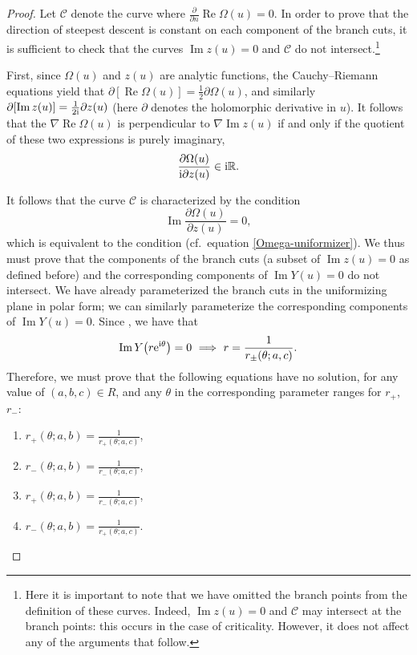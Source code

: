\documentclass[pdftex]{sigma}
\numberwithin{equation}{section}
\begin{document}
\begin{proof}
Let $\mathcal{C}$ denote the curve where $\frac{\partial}{\partial n} \operatorname{Re}\Omega(u) = 0$. In order to prove that the direction of steepest descent is constant on each component of the branch cuts, it is sufficient to check that the curves $\operatorname{Im} z(u) = 0$ and $\mathcal{C}$ do not intersect.\footnote{Here it is important to note that we have omitted the branch points from the definition of these curves. Indeed, $\operatorname{Im} z(u) = 0$ and $\mathcal{C}$ may intersect at the branch points: this occurs in the case of criticality. However, it does not affect any of the arguments that follow.}

First, since $\Omega(u)$ and $z(u)$ are analytic functions, the Cauchy--Riemann equations yield that $\partial[ \operatorname{Re}\Omega(u)] = \frac{1}{2}\partial \Omega(u)$,
and similarly $\partial [\operatorname{Im} z(u)] = \frac{1}{2{\rm i}}\partial z(u)$ (here $\partial$ denotes the holomorphic derivative in $u$). It follows that the $\nabla \operatorname{Re}\Omega(u)$ is perpendicular to $\nabla \operatorname{Im} z(u)$
if and only if the quotient of these two expressions is purely imaginary,
 \begin{equation*}
 \frac{\partial \Omega(u)}{{\rm i} \partial z(u)} \in {\rm i}\mathbb{R}.
 \end{equation*}

It follows that the curve $\mathcal{C}$ is characterized by the condition
 \begin{equation*}
 \operatorname{Im}\frac{\partial \Omega(u)}{\partial z(u)} = 0,
 \end{equation*}
which is equivalent to the condition  (cf.\ equation \eqref{Omega-uniformizer}).
We thus must prove that the components of the branch cuts (a subset of $\operatorname{Im} z(u) = 0$ as defined before) and the corresponding components of
$\operatorname{Im} Y(u) =0$ do not intersect.
We have already parameterized the branch cuts in the uniformizing plane in polar form; we can similarly parameterize the corresponding components of $\operatorname{Im}Y (u) = 0$. Since , we have that
 \begin{equation*}
 \operatorname{Im} Y\bigl(r{\rm e}^{{\rm i}\theta}\bigr) = 0 \ \Longrightarrow \ r = \frac{1}{r_{\pm}(\theta;a,c)}.
 \end{equation*}
Therefore, we must prove that the following equations have no solution, for any value of ${(a,b,c) \in R}$, and any $\theta$ in the corresponding parameter ranges
for $r_+$, $r_-$:
 \begin{enumerate}\itemsep=0pt
 \item[$(1)$] $r_{+}(\theta;a,b) = \frac{1}{r_{+}(\theta;a,c)}$,
 \item[$(2)$] $r_{-}(\theta;a,b) = \frac{1}{r_{-}(\theta;a,c)}$,
 \item[$(3)$] $r_{+}(\theta;a,b) = \frac{1}{r_{-}(\theta;a,c)}$,
 \item[$(4)$] $r_{-}(\theta;a,b) = \frac{1}{r_{+}(\theta;a,c)}$.
 \end{enumerate}


\end{proof}
\end{document}
